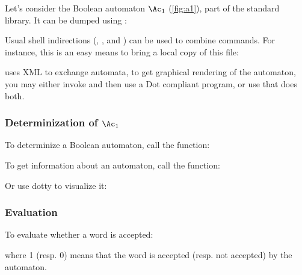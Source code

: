 Let's consider the Boolean automaton $\Ac_1$ (\autoref{fig:a1}), part
of the standard library.  It can be dumped using
:


Usual shell indirections (\samp{|}, \samp{>}, and \samp{<}) can be
used to combine \tafkit commands.  For instance, this is an easy means
to bring a local copy of this file:


\tafkit uses XML to exchange automata, to get graphical rendering of
the automaton, you may either invoke  and then
use a Dot compliant program, or use  that does
both.

\begin{center}
\end{center}


\subsubsection{Determinization of $\Ac_1$}
To determinize a Boolean automaton, call the
 function:


To get information about an automaton, call the  function:

Or use dotty to visualize it:
\begin{center}
\end{center}

\subsubsection{Evaluation}

To evaluate whether a word is accepted:


\noindent
where 1 (resp. 0) means that the word is accepted (resp. not accepted)
by the automaton.

